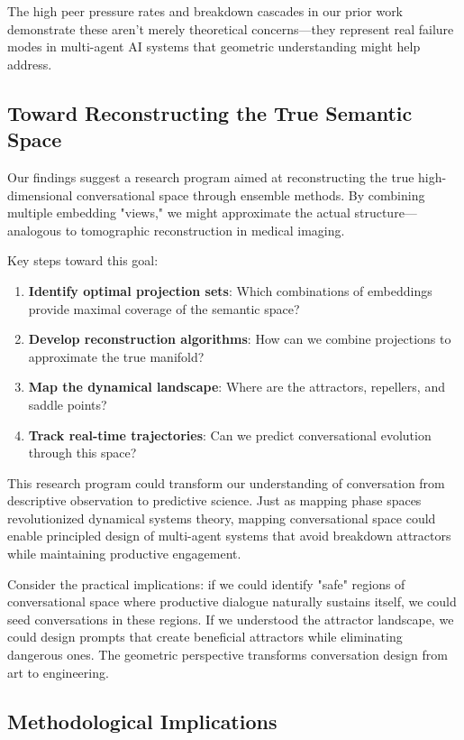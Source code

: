\documentclass[11pt,letterpaper]{article}
\begin{document}
The high peer pressure rates and breakdown cascades in our prior work demonstrate these aren't merely theoretical concerns—they represent real failure modes in multi-agent AI systems that geometric understanding might help address.

\subsection{Toward Reconstructing the True Semantic Space}

Our findings suggest a research program aimed at reconstructing the true high-dimensional conversational space through ensemble methods. By combining multiple embedding "views," we might approximate the actual structure—analogous to tomographic reconstruction in medical imaging.

Key steps toward this goal:
\begin{enumerate}
\item \textbf{Identify optimal projection sets}: Which combinations of embeddings provide maximal coverage of the semantic space?
\item \textbf{Develop reconstruction algorithms}: How can we combine projections to approximate the true manifold?
\item \textbf{Map the dynamical landscape}: Where are the attractors, repellers, and saddle points?
\item \textbf{Track real-time trajectories}: Can we predict conversational evolution through this space?
\end{enumerate}

This research program could transform our understanding of conversation from descriptive observation to predictive science. Just as mapping phase spaces revolutionized dynamical systems theory, mapping conversational space could enable principled design of multi-agent systems that avoid breakdown attractors while maintaining productive engagement.

Consider the practical implications: if we could identify "safe" regions of conversational space where productive dialogue naturally sustains itself, we could seed conversations in these regions. If we understood the attractor landscape, we could design prompts that create beneficial attractors while eliminating dangerous ones. The geometric perspective transforms conversation design from art to engineering.

\subsection{Methodological Implications}
\end{document}
